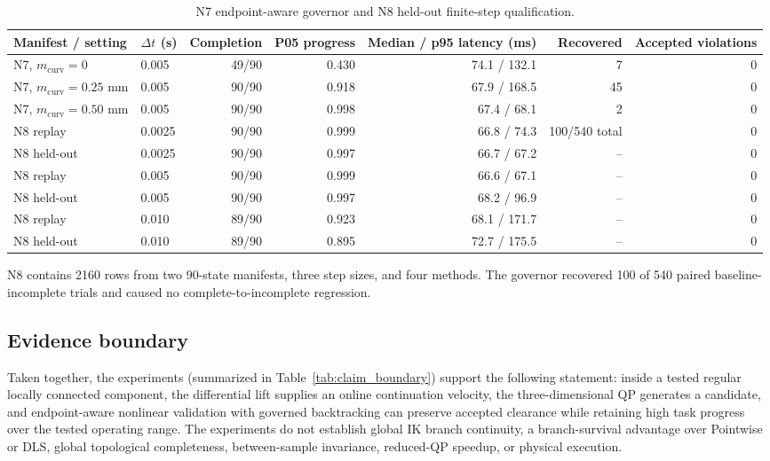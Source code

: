 \documentclass[preprint,12pt]{elsarticle}
\begin{document}
\begin{table}[t]
\centering
\scriptsize
\caption{N7 endpoint-aware governor and N8 held-out finite-step qualification.}
\label{tab:n7_n8_governor}
\begin{tabularx}{\textwidth}{@{}p{}lrrrrr@{}}
\toprule
Manifest / setting & $\Delta t$ (s) & Completion & P05 progress & Median / p95 latency (ms) & Recovered & Accepted violations \\
\midrule
N7, $m_{\mathrm{curv}}=0$ & 0.005 & 49/90 & 0.430 & 74.1 / 132.1 & 7 & 0 \\
N7, $m_{\mathrm{curv}}=0.25$ mm & 0.005 & 90/90 & 0.918 & 67.9 / 168.5 & 45 & 0 \\
N7, $m_{\mathrm{curv}}=0.50$ mm & 0.005 & 90/90 & 0.998 & 67.4 / 68.1 & 2 & 0 \\
N8 replay & 0.0025 & 90/90 & 0.999 & 66.8 / 74.3 & 100/540 total & 0 \\
N8 held-out & 0.0025 & 90/90 & 0.997 & 66.7 / 67.2 & -- & 0 \\
N8 replay & 0.005 & 90/90 & 0.999 & 66.6 / 67.1 & -- & 0 \\
N8 held-out & 0.005 & 90/90 & 0.997 & 68.2 / 96.9 & -- & 0 \\
N8 replay & 0.010 & 89/90 & 0.923 & 68.1 / 171.7 & -- & 0 \\
N8 held-out & 0.010 & 89/90 & 0.895 & 72.7 / 175.5 & -- & 0 \\
\bottomrule
\end{tabularx}
\vspace{1mm}
\parbox{0.94\textwidth}{\footnotesize N8 contains 2160 rows from two 90-state manifests, three step sizes, and four methods. The governor recovered 100 of 540 paired baseline-incomplete trials and caused no complete-to-incomplete regression.}
\end{table}


\subsection{Evidence boundary}

Taken together, the experiments (summarized in Table~\ref{tab:claim_boundary}) support the following statement: inside a tested regular locally connected component, the differential lift supplies an online continuation velocity, the three-dimensional QP generates a candidate, and endpoint-aware nonlinear validation with governed backtracking can preserve accepted clearance while retaining high task progress over the tested operating range. The experiments do not establish global IK branch continuity, a branch-survival advantage over Pointwise or DLS, global topological completeness, between-sample invariance, reduced-QP speedup, or physical execution.
\end{document}
